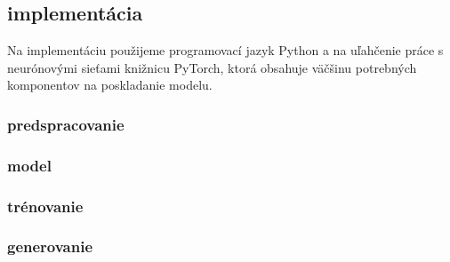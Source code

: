 
\subsection{implementácia}
Na implementáciu použijeme programovací jazyk Python a na uľahčenie práce s neurónovými sieťami knižnicu PyTorch, ktorá obsahuje väčšinu potrebných komponentov na poskladanie modelu.

\subsubsection{predspracovanie}

\subsubsection{model}

\subsubsection{trénovanie}

\subsubsection{generovanie}
